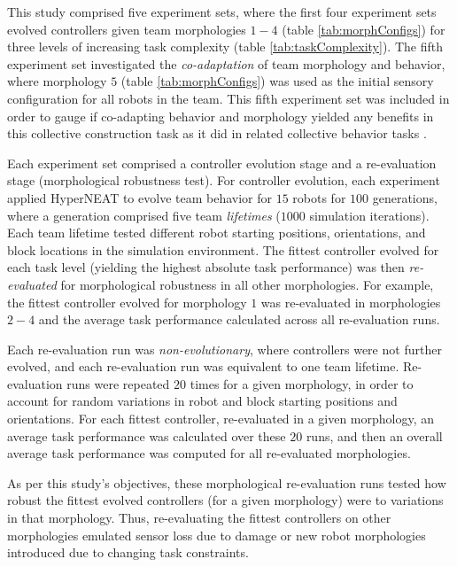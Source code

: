 \documentclass[conference]{IEEEtran}
\begin{document}
This study comprised five experiment sets, where the first four experiment sets evolved
controllers given team morphologies $1-4$ (table \ref{tab:morphConfigs})
for three levels of increasing task complexity (table \ref{tab:taskComplexity}).
The fifth experiment set investigated the \textit{co-adaptation} of team morphology
and behavior, where morphology $5$ (table \ref{tab:morphConfigs}) was used
as the initial sensory configuration for all robots in the team.
This fifth experiment set was included in order to gauge if co-adapting behavior
and morphology yielded any benefits in this collective construction task as it did in related
collective behavior tasks \cite{HewlandNitschke2015}.

Each experiment set comprised a controller evolution stage and a re-evaluation stage
(morphological robustness test).
For controller evolution, each experiment applied HyperNEAT to evolve team behavior for
$15$ robots for $100$ generations,
where a generation comprised five team \textit{lifetimes} ($1000$ simulation iterations).
Each team lifetime tested different robot starting positions, orientations, and block locations
in the simulation environment.
The fittest controller evolved for each task level (yielding the highest absolute task performance)
was then \textit{re-evaluated} for morphological robustness in all other morphologies.
For example, the fittest controller evolved for morphology $1$ was re-evaluated in morphologies
$2-4$ and the average task performance calculated across all re-evaluation runs.

Each re-evaluation run was \textit{non-evolutionary}, where controllers were not further evolved,
and each re-evaluation run was equivalent to one team lifetime.
Re-evaluation runs were repeated $20$ times for a given morphology, in order to account for random variations in robot and block
starting positions and orientations.
For each fittest controller, re-evaluated in a given morphology, an average task performance was
calculated over these $20$ runs, and then an overall average task performance was computed for
all re-evaluated morphologies.

As per this study's objectives, these morphological re-evaluation
runs tested how robust the fittest evolved controllers (for a given morphology) were to variations
in that morphology.
Thus, re-evaluating the fittest controllers on other morphologies emulated sensor loss due
to damage or new robot morphologies introduced due to changing task constraints.
\end{document}
